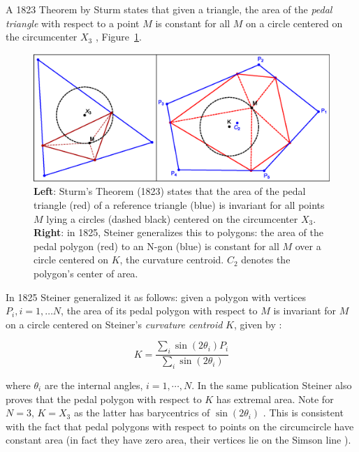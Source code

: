 A 1823 Theorem by Sturm states that given a triangle, the area of the {\em pedal triangle} with respect to a point $M$ is constant for all $M$ on a circle centered on the circumcenter $X_3$ \cite[Thm. 7.28, page 221]{ostermann2012}, Figure~\ref{fig:sturm}.

\begin{figure}
    \centering
    \includegraphics[width=\textwidth]{pics/0006_sturm_and_steiner.eps}
    \caption{\textbf{Left}: Sturm's Theorem (1823) states that the area of the pedal triangle (red) of a reference triangle (blue) is invariant for all points $M$ lying a circles (dashed black) centered on the circumcenter $X_3$. \textbf{Right}: in 1825, Steiner generalizes this to polygons: the area of the pedal polygon (red) to an N-gon (blue) is constant for all $M$ over a circle centered on $K$, the curvature centroid. $C_2$ denotes the polygon's center of area.}
    \label{fig:sturm}
\end{figure}

In 1825 Steiner generalized it as follows: given a polygon with vertices $P_i,i=1,{\ldots}N$, the area of its pedal polygon with respect to $M$ is invariant for $M$ on a circle centered on Steiner's {\em curvature centroid} $K$, given by \cite{steiner1838}:

\begin{equation*}
    K = \frac{\sum_i{\sin(2\theta_i) P_i}}{\sum_i{\sin(2\theta_i)}}
\end{equation*}

\noindent where $\theta_i$ are the internal angles, $i=1,\cdots,N$. In the same publication Steiner also proves that the pedal polygon with respect to $K$ has extremal area. Note for $N=3$, $K=X_3$ as the latter has barycentrics of $\sin(2\theta_i)$ \cite{etc}. This is consistent with the fact that pedal polygons with respect to points on the circumcircle have constant area (in fact they have zero area, their vertices lie on the Simson line \cite[Simson Line]{mw}).

